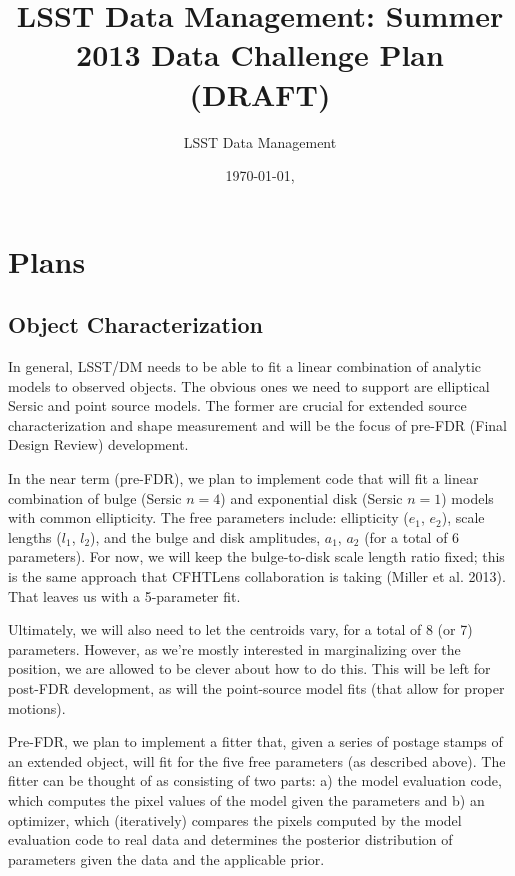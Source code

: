 \documentclass[12pt]{article}
\begin{document}
\title{LSST Data Management: Summer 2013 Data Challenge Plan (DRAFT)}
\author{LSST Data Management}
\date{\today{}, \currenttime \\ \vspace{0.5em}  }
\maketitle

\section{Plans}
\subsection{Object Characterization}

In general, LSST/DM needs to be able to fit a linear combination of
analytic models to observed objects. The obvious ones we need to
support are elliptical Sersic and point source models. The former
are crucial for extended source characterization and shape
measurement and will be the focus of pre-FDR (Final Design Review)
development.

In the near term (pre-FDR), we plan to implement
code that will fit a linear combination of bulge (Sersic $n=4$) and
exponential disk (Sersic $n=1$) models with common ellipticity. The
free parameters include: ellipticity ($e_1$, $e_2$), scale lengths
($l_1$, $l_2$), and the bulge and disk amplitudes, $a_1$, $a_2$ (for a total
of 6 parameters). For now, we will keep the bulge-to-disk scale
length ratio fixed; this is the same approach that CFHTLens
collaboration is taking (Miller et al. 2013). That leaves us with
a 5-parameter fit.

Ultimately, we will also need to let the centroids vary, for a total
of 8 (or 7) parameters. However, as we're mostly interested in
marginalizing over the position, we are allowed to be clever about
how to do this. This will be left for post-FDR development, as will
the point-source model fits (that allow for proper motions).

Pre-FDR, we plan to implement a fitter that, given a series of
postage stamps of an extended object, will fit for the five free
parameters (as described above). The fitter can be thought of as
consisting of two parts: a) the model evaluation code, which computes
the pixel values of the model given the parameters and b) an
optimizer, which (iteratively) compares the pixels computed by the
model evaluation code to real data and determines the posterior
distribution of parameters given the data and the applicable prior.
\end{document}
